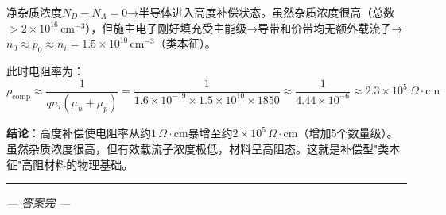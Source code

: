 \documentclass[12pt,a4paper]{ctexart}
\begin{document}
净杂质浓度$N_D - N_A = 0$→半导体进入高度补偿状态。虽然杂质浓度很高（总数$>2\times10^{16}\,\text{cm}^{-3}$），但施主电子刚好填充受主能级→导带和价带均无额外载流子→$n_0 \approx p_0 \approx n_i = 1.5\times10^{10}\,\text{cm}^{-3}$（类本征）。

此时电阻率为：
\[
\rho_{\text{comp}} \approx \frac{1}{q n_i (\mu_n + \mu_p)}
= \frac{1}{1.6\times10^{-19} \times 1.5\times10^{10} \times 1850}
\approx \frac{1}{4.44\times10^{-6}}
\approx 2.3\times10^5\ \Omega\cdot\text{cm}
\]

\textbf{结论}：高度补偿使电阻率从约$1\,\Omega\cdot\text{cm}$暴增至约$2\times10^5\,\Omega\cdot\text{cm}$（增加5个数量级）。虽然杂质浓度很高，但有效载流子浓度极低，材料呈高阻态。这就是补偿型"类本征"高阻材料的物理基础。

\vspace{8pt}
\hrule
\vspace{8pt}

\begin{center}
\textit{--- 答案完 ---}
\end{center}
\end{document}
